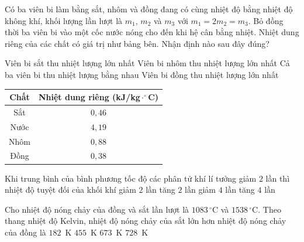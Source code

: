 	\begin{ex}%
		Có ba viên bi làm bằng sắt, nhôm và đồng đang có cùng nhiệt độ bằng nhiệt độ không khí, khối lượng lần lượt là $m_1$, $m_2$ và $m_3$ với $m_1=2m_2=m_3$. Bỏ đồng thời ba viên bi vào một cốc nước nóng cho đến khi hệ cân bằng nhiệt. Nhiệt dung riêng của các chất có giá trị như bảng bên. Nhận định nào sau đây đúng?
		\par\noindent
		\begin{minipage}[c]{0.6\linewidth}
		\choice
		{\True Viên bi sắt thu nhiệt lượng lớn nhất}
		{Viên bi nhôm thu nhiệt lượng lớn nhất}
		{Cả ba viên bi thu nhiệt lượng bằng nhau}
		{Viên bi đồng thu nhiệt lượng lớn nhất}
		\end{minipage}\hfill
		\begin{minipage}[c]{0.38\linewidth}
			\centering
			{\footnotesize
			\begin{tabular}{|c|c|}
				\hline
				\textbf{Chất} & \textbf{Nhiệt dung riêng (kJ/kg$\cdot^\circ$C)}\\
				\hline
				Sắt & $0{,}46$\\
				\hline
				Nước & $4{,}19$\\
				\hline
				Nhôm & $0{,}88$\\
				\hline
				Đồng & $0{,}38$\\
				\hline
			\end{tabular}}
		\end{minipage}
	\end{ex}

	\begin{ex}%
		Khi trung bình của bình phương tốc độ các phân tử khí lí tưởng giảm $2$ lần thì nhiệt độ tuyệt đối của khối khí
		\choice
		{\True giảm $2$ lần}
		{tăng $2$ lần}
		{giảm $4$ lần}
		{tăng $4$ lần}
	\end{ex}

	\begin{ex}%
		Cho nhiệt độ nóng chảy của đồng và sắt lần lượt là $1083\,^\circ\text{C}$ và $1538\,^\circ\text{C}$. Theo thang nhiệt độ Kelvin, nhiệt độ nóng chảy của sắt lớn hơn nhiệt độ nóng chảy của đồng là
		\choice
		{$182$~K}
		{\True $455$~K}
		{$673$~K}
		{$728$~K}
	\end{ex}

